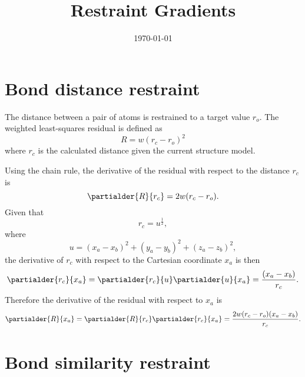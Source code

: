\documentclass[11pt]{article}
\title{Restraint Gradients}
\author{\lucjbourhis \and \rjgildea}
\date{\today}
\begin{document}
\maketitle

\section{Bond distance restraint}

The distance between a pair of atoms is restrained to a target value $r_o$.
The weighted least-squares residual is defined as
\begin{equation}
R = w(r_c - r_o)^2
\end{equation}
where $r_c$ is the calculated distance given the current structure model.

Using the chain rule, the derivative of the residual with respect to the
distance $r_c$ is
\begin{equation}
\partialder{R}{r_c} = 2w(r_c - r_o).
\end{equation}
Given that
\begin{equation*}
r_c = u^\frac{1}{2},
\end{equation*}
where
\begin{equation*}
u = (x_a - x_b)^2 + (y_a - y_b)^2 + (z_a - z_b)^2,
\end{equation*}
the derivative of $r_c$ with respect to the Cartesian coordinate $x_a$ is then
\begin{equation}
\partialder{r_c}{x_a} = \partialder{r_c}{u} \partialder{u}{x_a}= \frac{(x_a - x_b)}{r_c}.
\label{eqn:r_derivative}
\end{equation}
Therefore the derivative of the residual with respect to $x_a$ is
\begin{equation}
\partialder{R}{x_a} = \partialder{R}{r_c} \partialder{r_c}{x_a}= \frac{2 w (r_c - r_o)(x_a - x_b)}{r_c}.
\end{equation}



\section{Bond similarity restraint}
\end{document}
